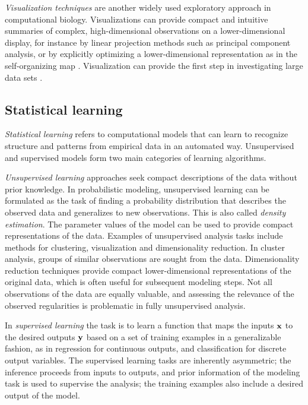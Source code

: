 {\it Visualization techniques} are another widely used exploratory
approach in computational biology. Visualizations can provide compact
and intuitive summaries of complex, high-dimensional observations on a
lower-dimensional display, for instance by linear projection methods
such as principal component analysis, or by explicitly optimizing a
lower-dimensional representation as in the self-organizing map
\citep[][]{Kohonen82}. Visualization can provide the first step in
investigating large data sets \citep{Evanko10}.

\subsection{Statistical learning}

\emph{Statistical learning} refers to computational models that can
learn to recognize structure and patterns from empirical data in an
automated way. Unsupervised and supervised models form two main
categories of learning algorithms.

{\it Unsupervised learning} approaches seek compact descriptions of
the data without prior knowledge. In probabilistic modeling,
unsupervised learning can be formulated as the task of finding a
probability distribution that describes the observed data and
generalizes to new observations.  This is also called {\it density
estimation}.  The parameter values of the model can be used to provide
compact representations of the data. Examples of unsupervised analysis
tasks include methods for clustering, visualization and dimensionality
reduction.  In cluster analysis, groups of similar observations are
sought from the data. Dimensionality reduction techniques provide
compact lower-dimensional representations of the original data, which
is often useful for subsequent modeling steps. Not all observations of
the data are equally valuable, and assessing the relevance of the
observed regularities is problematic in fully unsupervised analysis.

In {\it supervised learning} the task is to learn a function that maps
the inputs \(\mathbf{x}\) to the desired outputs \(\mathbf{y}\) based on a set of
training examples in a generalizable fashion, as in regression for
continuous outputs, and classification for discrete output variables.
The supervised learning tasks are inherently asymmetric; the inference
proceeds from inputs to outputs, and prior information of the modeling
task is used to supervise the analysis; the training examples also
include a desired output of the model.

